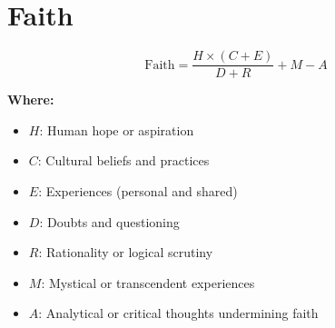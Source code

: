 \chapter{Faith}

\begin{equation}
\text{Faith} = \frac{H \times (C + E)}{D + R} + M - A
\end{equation}

\textbf{Where:}

\begin{itemize}
    \item $H$: Human hope or aspiration
    \item $C$: Cultural beliefs and practices
    \item $E$: Experiences (personal and shared)
    \item $D$: Doubts and questioning
    \item $R$: Rationality or logical scrutiny
    \item $M$: Mystical or transcendent experiences
    \item $A$: Analytical or critical thoughts undermining faith
\end{itemize}